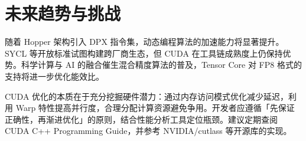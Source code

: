\chapter{未来趋势与挑战}
随着 Hopper 架构引入 DPX 指令集，动态编程算法的加速能力将显著提升。SYCL 等开放标准试图构建跨厂商生态，但 CUDA 在工具链成熟度上仍保持优势。科学计算与 AI 的融合催生混合精度算法的普及，Tensor Core 对 FP8 格式的支持将进一步优化能效比。\par
CUDA 优化的本质在于充分挖掘硬件潜力：通过内存访问模式优化减少延迟，利用 Warp 特性提高并行度，合理分配计算资源避免争用。开发者应遵循「先保证正确性，再渐进优化」的原则，结合性能分析工具定位瓶颈。建议定期查阅 CUDA C++ Programming Guide，并参考 NVIDIA/cutlass 等开源库的实现。\par
